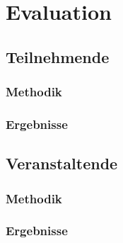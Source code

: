 \chapter{Evaluation}
\section{Teilnehmende}
\subsection{Methodik}
\subsection{Ergebnisse}
\section{Veranstaltende}
\subsection{Methodik}
\subsection{Ergebnisse}